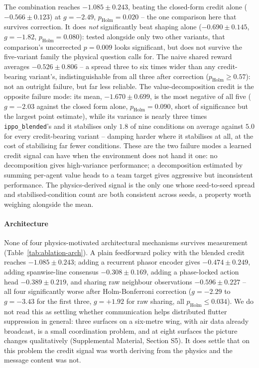 \documentclass[journal]{new-aiaa}
\begin{document}
\begin{table}[t]
\centering
\caption{Credit-assignment ablation at $\sigma=0.05$, six seeds per
variant. All ten pairwise $p$-values are Holm-Bonferroni corrected across
this family.}
\label{tab:ablation-credit}
\small

\end{table}

The combination reaches $-1.085 \pm 0.243$, beating the closed-form credit
alone ($-0.566\pm0.123$) at $g=-2.49$, $p_{\mathrm{Holm}}=0.020$ -- the one
comparison here that survives correction. It does \emph{not} significantly
beat shaping alone ($-0.690\pm0.145$, $g=-1.82$, $p_{\mathrm{Holm}}=0.080$):
tested alongside only two other variants, that comparison's uncorrected
$p=0.009$ looks significant, but does not survive the five-variant family
the physical question calls for. The naive shared reward averages
$-0.526\pm0.806$ -- a spread three to six times wider than any
credit-bearing variant's, indistinguishable from all three after
correction ($p_{\mathrm{Holm}}\ge0.57$): not an outright failure, but far
less reliable. The value-decomposition credit is the opposite failure
mode: its mean, $-1.670\pm0.699$, is the most negative of all five
($g=-2.03$ against the closed form alone, $p_{\mathrm{Holm}}=0.090$, short
of significance but the largest point estimate), while its variance is
nearly three times \texttt{ippo\_blended}'s and it stabilises only $1.8$ of
nine conditions on average against $5.0$ for every credit-bearing variant
-- damping harder where it stabilises at all, at the cost of stabilising
far fewer conditions. These are the two failure modes a learned credit
signal can have when the environment does not hand it one: no
decomposition gives high-variance performance; a decomposition estimated
by summing per-agent value heads to a team target gives aggressive but
inconsistent performance. The physics-derived signal is the only one whose
seed-to-seed spread and stabilised-condition count are both consistent
across seeds, a property worth weighing alongside the mean.

\paragraph{Architecture}
None of four physics-motivated architectural mechanisms survives
measurement (Table~\ref{tab:ablation-arch}). A plain feedforward policy
with the blended credit reaches $-1.085\pm0.243$; adding a recurrent
phasor encoder gives $-0.474\pm0.249$, adding spanwise-line consensus
$-0.308\pm0.169$, adding a phase-locked action head $-0.389\pm0.219$, and
sharing raw neighbour observations $-0.596\pm0.227$ -- all four
significantly worse after Holm-Bonferroni correction ($g=-2.29$ to
$g=-3.43$ for the first three, $g=+1.92$ for raw sharing, all
$p_{\mathrm{Holm}}\le0.034$). We do not read this as settling whether
communication helps distributed flutter suppression in general: three
surfaces on a six-metre wing, with air data already broadcast, is a small
coordination problem, and at eight surfaces the picture changes
qualitatively (Supplemental Material, Section S5). It does settle that on
this problem the credit signal was worth deriving from the physics and the
message content was not.
\end{document}
